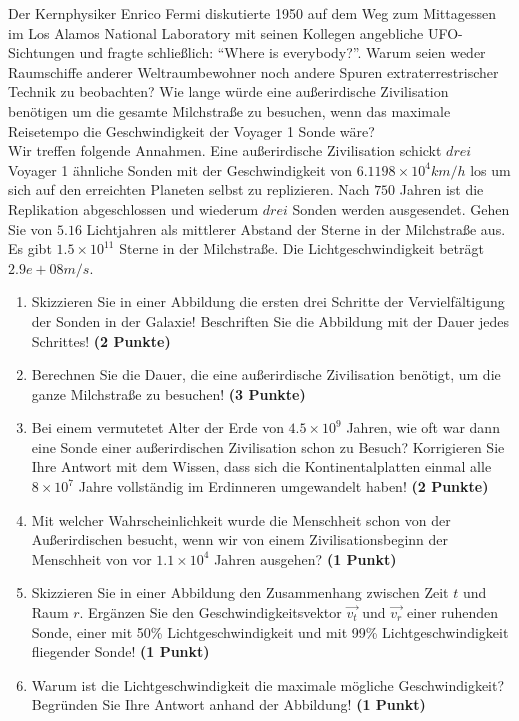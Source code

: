\documentclass[a4paper, 10pt]{scrartcl}\usepackage[]{graphicx}\usepackage[]{xcolor}
\begin{document}
Der Kernphysiker Enrico Fermi diskutierte 1950 auf dem Weg zum Mittagessen
im Los Alamos National Laboratory mit seinen Kollegen angebliche
UFO-Sichtungen und fragte schlie{\ss}lich: "`Where is everybody?"'. Warum seien
weder Raumschiffe anderer Weltraumbewohner noch andere Spuren
extraterrestrischer Technik zu beobachten? Wie lange w{\"u}rde eine au{\ss}erirdische
Zivilisation ben{\"o}tigen um die gesamte Milchstra{\ss}e zu
besuchen, wenn das maximale Reisetempo die Geschwindigkeit der Voyager 1 Sonde w{\"a}re?\\[-1ex]

Wir treffen folgende Annahmen. Eine au{\ss}erirdische Zivilisation schickt $drei$
Voyager 1 {\"a}hnliche Sonden mit der Geschwindigkeit von $\ensuremath{6.1198\times 10^{4}}km/h$
los um sich auf den erreichten Planeten selbst zu replizieren. Nach
$750$ Jahren ist die Replikation abgeschlossen und wiederum
$drei$ Sonden werden ausgesendet. Gehen Sie von
$5.16$ Lichtjahren als mittlerer Abstand der Sterne in der
Milchstra{\ss}e aus. Es gibt $\ensuremath{1.5\times 10^{11}}$ Sterne in der Milchstra{\ss}e. Die
Lichtgeschwindigkeit betr{\"a}gt $2.9e+08m/s$.

\begin{enumerate}
\item Skizzieren Sie in einer Abbildung die ersten drei Schritte der
  Vervielf{\"a}ltigung der Sonden in der Galaxie! Beschriften Sie die Abbildung
  mit der Dauer jedes Schrittes! \textbf{(2 Punkte)}
\item Berechnen Sie die Dauer, die eine au{\ss}erirdische Zivilisation
  ben{\"o}tigt, um die ganze Milchstra{\ss}e zu besuchen! \textbf{(3 Punkte)}
\item Bei einem vermutetet Alter der Erde von $\ensuremath{4.5\times 10^{9}}$ Jahren,
  wie oft war dann eine Sonde einer au{\ss}erirdischen Zivilisation schon zu
  Besuch? Korrigieren Sie Ihre Antwort mit dem Wissen, dass sich die
  Kontinentalplatten einmal alle $\ensuremath{8\times 10^{7}}$ Jahre vollst{\"a}ndig im
  Erdinneren umgewandelt haben! \textbf{(2 Punkte)}
\item Mit welcher Wahrscheinlichkeit wurde die Menschheit schon von der
  Au{\ss}erirdischen besucht, wenn wir von einem Zivilisationsbeginn der
  Menschheit von vor $\ensuremath{1.1\times 10^{4}}$ Jahren ausgehen? \textbf{(1 Punkt)}
\item Skizzieren Sie in einer Abbildung den Zusammenhang zwischen Zeit $t$
  und Raum $r$. Erg{\"a}nzen Sie den Geschwindigkeitsvektor $\vec{v_t}$ und
  $\vec{v_r}$ einer ruhenden Sonde, einer mit 50\% Lichtgeschwindigkeit und
  mit 99\% Lichtgeschwindigkeit fliegender Sonde! \textbf{(1 Punkt)}
\item Warum ist die Lichtgeschwindigkeit die maximale m{\"o}gliche Geschwindigkeit?
Begr{\"u}nden Sie Ihre Antwort anhand der Abbildung!  \textbf{(1 Punkt)}
\end{enumerate}
\end{document}
